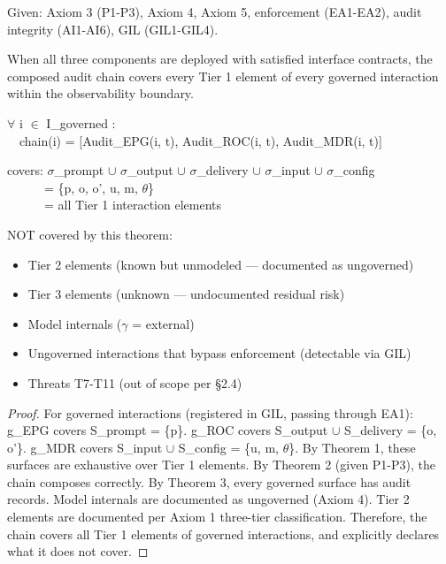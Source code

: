 \begin{cthm}
Given: Axiom 3 (P1-P3), Axiom 4, Axiom 5, enforcement (EA1-EA2), audit integrity (AI1-AI6), GIL (GIL1-GIL4).

When all three components are deployed with satisfied interface contracts, the composed audit chain covers every Tier 1 element of every governed interaction within the observability boundary.

\begin{claddisp}
$\forall$ i $\in$ I\_governed :\\
~~chain(i) = [Audit\_EPG(i, t), Audit\_ROC(i, t), Audit\_MDR(i, t)]\\
\end{claddisp}
\begin{claddisp}
covers: $\sigma$\_prompt $\cup$ $\sigma$\_output $\cup$ $\sigma$\_delivery $\cup$ $\sigma$\_input $\cup$ $\sigma$\_config\\
~~~~~~= \{p, o, o', u, m, $\theta$\}\\
~~~~~~= all Tier 1 interaction elements\\
\end{claddisp}
NOT covered by this theorem:
\begin{itemize}
  \item Tier 2 elements (known but unmodeled --- documented as ungoverned)
  \item Tier 3 elements (unknown --- undocumented residual risk)
  \item Model internals ($\gamma$ = external)
  \item Ungoverned interactions that bypass enforcement (detectable via GIL)
  \item Threats T7-T11 (out of scope per \S{}2.4)
\end{itemize}

\end{cthm}

\begin{proof}
For governed interactions (registered in GIL, passing through EA1):
g\_\allowbreak{}EPG covers S\_\allowbreak{}prompt = \{p\}.
g\_\allowbreak{}ROC covers S\_\allowbreak{}output $\cup$ S\_\allowbreak{}delivery = \{o, o'\}.
g\_\allowbreak{}MDR covers S\_\allowbreak{}input $\cup$ S\_\allowbreak{}config = \{u, m, $\theta$\}.
By Theorem 1, these surfaces are exhaustive over Tier 1 elements.
By Theorem 2 (given P1-P3), the chain composes correctly.
By Theorem 3, every governed surface has audit records.
Model internals are documented as ungoverned (Axiom 4).
Tier 2 elements are documented per Axiom 1 three-tier classification.
Therefore, the chain covers all Tier 1 elements of governed interactions, and explicitly declares what it does not cover.

\end{proof}






